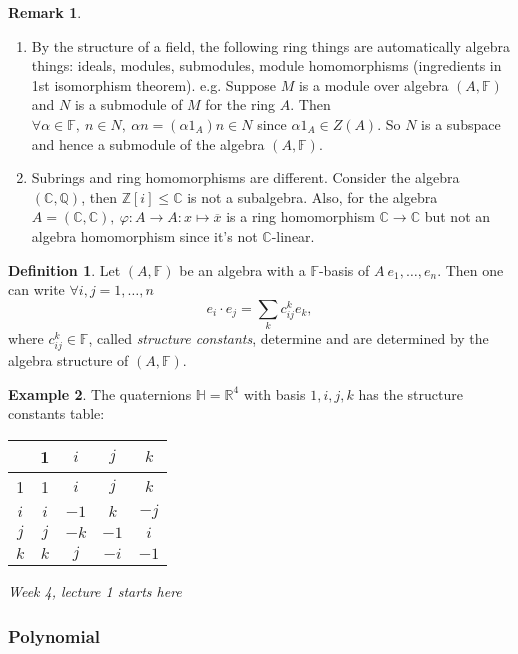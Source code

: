 \documentclass[a4paper]{article}
\newcommand{\F}{\mathbb{F}}
\newcommand{\Z}{\mathbb{Z}}
\newcommand{\Q}{\mathbb{Q}}
\newcommand{\R}{\mathbb{R}}
\newcommand{\C}{\mathbb{C}}
\newcommand{\Hq}{\mathbb{H}}
\theoremstyle{definition}
\newtheorem{defn}{Definition}[subsection]
\newtheorem{example}[defn]{Example}
\newtheorem*{remark}{Remark}
\begin{document}
\begin{remark}
\begin{enumerate}
\item By the structure of a field, the following ring things are automatically algebra things: ideals, modules, submodules, module homomorphisms (ingredients in 1st isomorphism theorem). e.g. Suppose $M$ is a module over algebra $(A,\F)$ and $N$ is a submodule of $M$ for the ring $A$. Then $\forall\alpha\in\F,\ n\in N,\ \alpha n=(\alpha 1_A) n\in N$ since $\alpha 1_A\in Z(A)$. So $N$ is a subspace and hence a submodule of the algebra $(A,\F)$.
\item Subrings and ring homomorphisms are different. Consider the algebra $(\C,\Q)$, then $\Z[i]\leq \C$ is not a subalgebra. Also, for the algebra $A=(\C,\C),\ \varphi:A\rightarrow A:x\mapsto\overline{x}$ is a ring homomorphism $\C\rightarrow \C$ but not an algebra homomorphism since it's not $\C$-linear.
\end{enumerate}
\end{remark}

\begin{defn}
Let $(A,\F)$ be an algebra with a $\F$-basis of $A\ e_1,\ldots,e_n$. Then one can write $\forall i,j=1,\ldots,n$
\[
e_i\cdot e_j=\sum_k c_{ij}^k e_k,
\]
where $c_{ij}^k\in\F$, called \textit{structure constants}, determine and are determined by the algebra structure of $(A,\F)$.
\end{defn}
\begin{example}
\label{example:quaternionsstructureconstants}
The quaternions $\Hq=\R^4$ with basis $1,i,j,k$ has the structure constants table:

\begin{table}[h]
\centering
\begin{tabular}{c|cccc}
    & 1   & $i$  & $j$  & $k$  \\ \hline
1   & 1   & $i$  & $j$  & $k$  \\
$i$ & $i$ & $-1$ & $k$  & $-j$ \\
$j$ & $j$ & $-k$ & $-1$ & $i$  \\
$k$ & $k$ & $j$  & $-i$ & $-1$
\end{tabular}
\end{table}
\end{example}

\begin{flushright}
\textit{Week 4, lecture 1 starts here}
\end{flushright}

\subsubsection{Polynomial}
\end{document}
